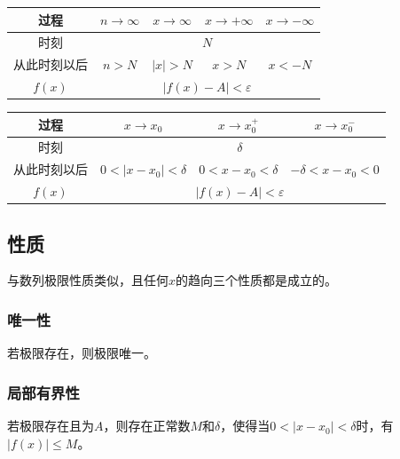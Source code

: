\documentclass[UTF8, 12pt]{ctexart}
\begin{document}
    \begin{center}
        \begin{tabular}{|c|c|c|c|c|}
            \hline
            过程     & $n\to\infty$ & $x\to\infty$     & $x\to+\infty$ & $x\to-\infty$ \\ \hline
            时刻 & \multicolumn{4}{c|}{$N$} \\ \hline
            从此时刻以后 & $n>N$        & $\vert x\vert>N$ & $x>N$         & $x<-N$        \\ \hline
            $f(x)$ & \multicolumn{4}{c|}{$\vert f(x)-A\vert<\varepsilon$} \\
            \hline
        \end{tabular}
    \end{center}

    \begin{center}
        \begin{tabular}{|c|c|c|c|}
            \hline
            过程     & $x\to x_0$                  & $x\to x_0^+$     & $x\to x_0^-$      \\ \hline
            时刻 & \multicolumn{3}{c|}{$\delta$} \\ \hline
            从此时刻以后 & $0<\vert x-x_0\vert<\delta$ & $0<x-x_0<\delta$ & $-\delta<x-x_0<0$ \\ \hline
            $f(x)$ & \multicolumn{3}{c|}{$\vert f(x)-A\vert<\varepsilon$} \\
            \hline
        \end{tabular}
    \end{center}

    \subsection{性质}

    与数列极限性质类似，且任何$x$的趋向三个性质都是成立的。

    \subsubsection{唯一性}

    若极限存在，则极限唯一。

    \subsubsection{局部有界性}

    若极限存在且为$A$，则存在正常数$M$和$\delta$，使得当$0<\vert x-x_0\vert<\delta$时，有$\vert f(x)\vert\leqslant M$。
\end{document}
